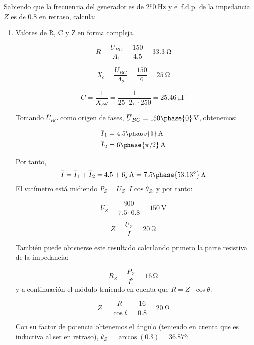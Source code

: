 \documentclass[12pt]{article}
\begin{document}
Sabiendo que la frecuencia del generador es de $\SI{250}{\hertz}$ y el f.d.p. de la impedancia $Z$ es de 0.8 en retraso, calcula:
\begin{enumerate}
\item Valores de R, C y Z en forma compleja.

  \begin{equation*}
    R = \frac{U_{BC}}{A_1} = \frac{150}{4.5} = \SI{33.3}{\ohm}
  \end{equation*}

  \begin{equation*}
    X_c = \frac{U_{BC}}{A_2} = \frac{150}{6} = \SI{25}{\ohm}
  \end{equation*}

  \begin{equation*}
    C = \frac{1}{X_c\omega} = \frac{1}{25 \cdot 2 \pi \cdot 250} = \SI{25.46}{\micro\farad}
  \end{equation*}

  Tomando $\overline{U}_{BC}$ como origen de fases, $\overline{U}_{BC} = \SI[parse-numbers=false]{150\phase{0}}{\volt}$, obtenemos:

  \begin{align*}
    \overline{I}_1 &= \SI[parse-numbers=false]{4.5\phase{0}}{\ampere}\\
    \overline{I}_2 &= \SI[parse-numbers=false]{6\phase{\pi/2}}{\ampere}
  \end{align*}

  Por tanto,
  \[
    \overline{I} = \overline{I}_1 + \overline{I}_2 = \SI[parse-numbers=false]{4.5+6j}{\ampere} = \SI[parse-numbers=false]{7.5\phase{\ang{53.13}}}{\ampere}
  \]
  El vatímetro está midiendo $P_Z = U_Z \cdot I \cos \theta_Z$, y por tanto:

  \[
    U_Z = \frac{900}{7.5 \cdot 0.8} = \SI{150}{\volt}
  \]

  \[
    Z = \frac{U_Z}{I} = \SI{20}{\ohm}
  \]

    También puede obtenerse este resultado calculando primero la parte resistiva de la impedancia:

  \[
    R_Z = \frac{P_Z}{I^2} = \SI{16}{\ohm}
  \]
  y a continuación el módulo teniendo en cuenta que $R = Z \cdot \cos \theta$:

  \[
    Z = \frac{R}{\cos \theta} = \frac{16}{0.8} = \SI{20}{\ohm}
  \]

  Con su factor de potencia obtenemos el ángulo (teniendo en cuenta que es inductiva al ser en retraso), $\theta_Z = \arccos(0.8) = \ang{36.87}$:


\end{enumerate}
\end{document}
